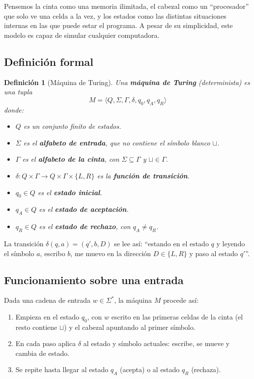 \documentclass[11pt,a4paper]{article}
\theoremstyle{definicion}
\newtheorem{definicion}{Definición}[section]
\newcommand{\bl}{\sqcup}
\begin{document}
\begin{intuicion}
Pensemos la cinta como una memoria ilimitada, el cabezal como un ``procesador'' que solo ve una celda a la vez, y los estados como las distintas situaciones internas en las que puede estar el programa. A pesar de su simplicidad, este modelo es capaz de simular cualquier computadora.
\end{intuicion}

\subsection{Definición formal}

\begin{definicion}[Máquina de Turing]
Una \textbf{máquina de Turing} (determinista) es una tupla
\[
M = \langle Q, \Sigma, \Gamma, \delta, q_0, q_A, q_R \rangle
\]
donde:
\begin{itemize}
    \item $Q$ es un conjunto \emph{finito} de estados.
    \item $\Sigma$ es el \textbf{alfabeto de entrada}, que \emph{no} contiene el símbolo blanco $\bl$.
    \item $\Gamma$ es el \textbf{alfabeto de la cinta}, con $\Sigma \subseteq \Gamma$ y $\bl \in \Gamma$.
    \item $\delta : Q \times \Gamma \rightarrow Q \times \Gamma \times \{L, R\}$ es la \textbf{función de transición}.
    \item $q_0 \in Q$ es el \textbf{estado inicial}.
    \item $q_A \in Q$ es el \textbf{estado de aceptación}.
    \item $q_R \in Q$ es el \textbf{estado de rechazo}, con $q_A \neq q_R$.
\end{itemize}
\end{definicion}

La transición $\delta(q, a) = (q', b, D)$ se lee así: ``estando en el estado $q$ y leyendo el símbolo $a$, escribo $b$, me muevo en la dirección $D \in \{L, R\}$ y paso al estado $q'$''.

\subsection{Funcionamiento sobre una entrada}

Dada una cadena de entrada $w \in \Sigma^*$, la máquina $M$ procede así:

\begin{enumerate}
    \item Empieza en el estado $q_0$, con $w$ escrito en las primeras celdas de la cinta (el resto contiene $\bl$) y el cabezal apuntando al primer símbolo.
    \item En cada paso aplica $\delta$ al estado y símbolo actuales: escribe, se mueve y cambia de estado.
    \item Se repite hasta llegar al estado $q_A$ (acepta) o al estado $q_R$ (rechaza).
\end{enumerate}
\end{document}
